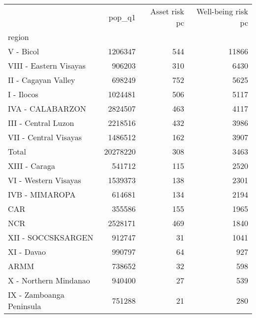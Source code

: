 \begin{tabular}{lrrr}
\toprule
{} &    pop\_q1 &  Asset risk pc &  Well-being risk pc \\
region                   &           &                &                     \\
\midrule
V - Bicol                &   1206347 &            544 &               11866 \\
VIII - Eastern Visayas   &    906203 &            310 &                6430 \\
II - Cagayan Valley      &    698249 &            752 &                5625 \\
I - Ilocos               &   1024481 &            506 &                5117 \\
IVA - CALABARZON         &   2824507 &            463 &                4117 \\
III - Central Luzon      &   2218516 &            432 &                3986 \\
VII - Central Visayas    &   1486512 &            162 &                3907 \\
Total                    &  20278220 &            308 &                3463 \\
XIII - Caraga            &    541712 &            115 &                2520 \\
VI - Western Visayas     &   1539373 &            138 &                2301 \\
IVB - MIMAROPA           &    614681 &            134 &                2194 \\
CAR                      &    355586 &            155 &                1965 \\
NCR                      &   2528171 &            469 &                1840 \\
XII - SOCCSKSARGEN       &    912747 &             31 &                1041 \\
XI - Davao               &    990797 &             64 &                 927 \\
ARMM                     &    738652 &             32 &                 598 \\
X - Northern Mindanao    &    940400 &             27 &                 539 \\
IX - Zamboanga Peninsula &    751288 &             21 &                 280 \\
\bottomrule
\end{tabular}
